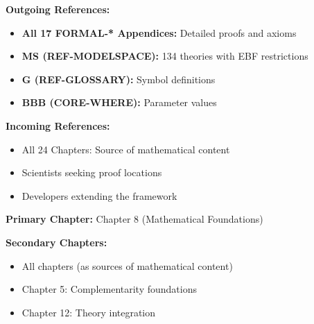 \begin{tcolorbox}[colback=gray!5!white, colframe=gray!75!black,
    title=\textbf{Cross-Reference Map}]

\textbf{Outgoing References:}
\begin{itemize}[nosep]
    \item \textbf{All 17 FORMAL-* Appendices:} Detailed proofs and axioms
    \item \textbf{MS (REF-MODELSPACE):} 134 theories with EBF restrictions
    \item \textbf{G (REF-GLOSSARY):} Symbol definitions
    \item \textbf{BBB (CORE-WHERE):} Parameter values
\end{itemize}

\textbf{Incoming References:}
\begin{itemize}[nosep]
    \item All 24 Chapters: Source of mathematical content
    \item Scientists seeking proof locations
    \item Developers extending the framework
\end{itemize}

\end{tcolorbox}

\begin{tcolorbox}[colback=purple!5!white, colframe=purple!75!black,
    title=\textbf{Chapter Linkage}]

\textbf{Primary Chapter:} Chapter 8 (Mathematical Foundations)

\textbf{Secondary Chapters:}
\begin{itemize}[nosep]
    \item All chapters (as sources of mathematical content)
    \item Chapter 5: Complementarity foundations
    \item Chapter 12: Theory integration
\end{itemize}

\end{tcolorbox}

